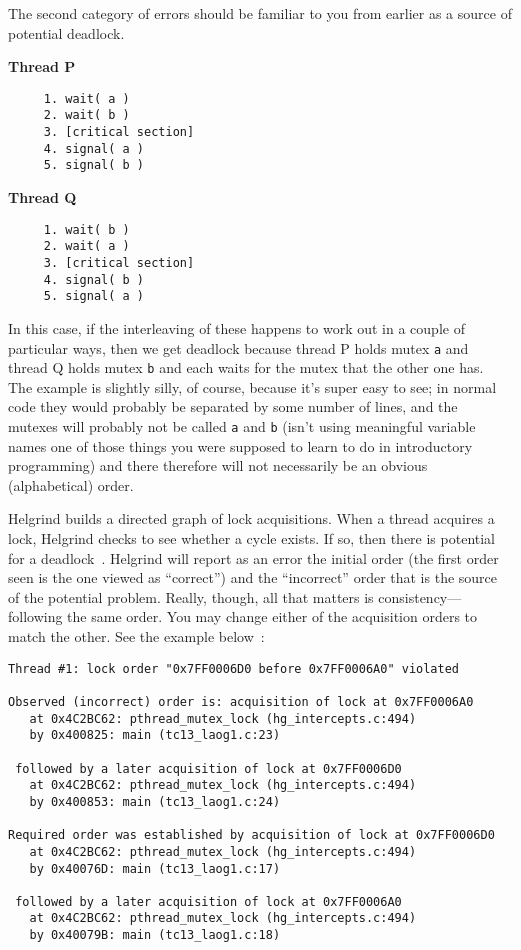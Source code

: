 The second category of errors should be familiar to you from earlier as a source of potential deadlock.

\begin{multicols}{2}
\textbf{Thread P}\vspace{-2em}
  \begin{verbatim}
	 1. wait( a ) 
	 2. wait( b )
	 3. [critical section]
	 4. signal( a )
	 5. signal( b )
  \end{verbatim}
\columnbreak
\textbf{Thread Q}\vspace{-2em}
  \begin{verbatim}
	 1. wait( b ) 
	 2. wait( a )
	 3. [critical section]
	 4. signal( b )
	 5. signal( a )
  \end{verbatim}
\end{multicols}
\vspace{-2em}

In this case, if the interleaving of these happens to work out in a couple of particular ways, then we get deadlock because thread P holds mutex \texttt{a} and thread Q holds mutex \texttt{b} and each waits for the mutex that the other one has. The example is slightly silly, of course, because it's super easy to see; in normal code they would probably be separated by some number of lines, and the mutexes will probably not be called \texttt{a} and \texttt{b} (isn't using meaningful variable names one of those things you were supposed to learn to do in introductory programming\textinterrobang) and there therefore will not necessarily be an obvious (alphabetical) order.

Helgrind builds a directed graph of lock acquisitions. When a thread acquires a lock, Helgrind checks to see whether a cycle exists. If so, then there is potential for a deadlock~\cite{helgrind}. Helgrind will report as an error the initial order (the first order seen is the one viewed as ``correct'') and the ``incorrect'' order that is the source of the potential problem. Really, though, all that matters is consistency---following the same order. You may change either of the acquisition orders to match the other. See the example below~\cite{helgrind}:

\begin{lstlisting}
Thread #1: lock order "0x7FF0006D0 before 0x7FF0006A0" violated

Observed (incorrect) order is: acquisition of lock at 0x7FF0006A0
   at 0x4C2BC62: pthread_mutex_lock (hg_intercepts.c:494)
   by 0x400825: main (tc13_laog1.c:23)

 followed by a later acquisition of lock at 0x7FF0006D0
   at 0x4C2BC62: pthread_mutex_lock (hg_intercepts.c:494)
   by 0x400853: main (tc13_laog1.c:24)

Required order was established by acquisition of lock at 0x7FF0006D0
   at 0x4C2BC62: pthread_mutex_lock (hg_intercepts.c:494)
   by 0x40076D: main (tc13_laog1.c:17)

 followed by a later acquisition of lock at 0x7FF0006A0
   at 0x4C2BC62: pthread_mutex_lock (hg_intercepts.c:494)
   by 0x40079B: main (tc13_laog1.c:18)
\end{lstlisting}

